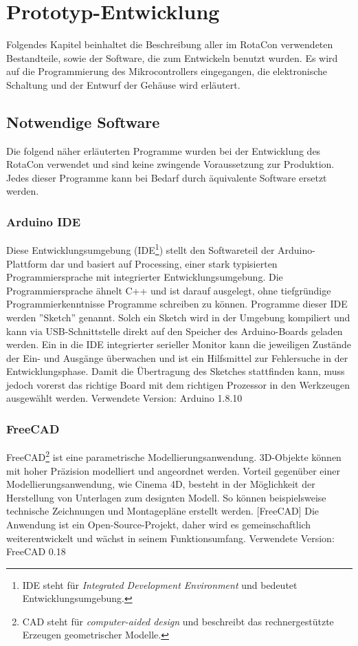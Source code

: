 \documentclass[11pt, titlepage]{report}
\begin{document}
	\chapter{Prototyp-Entwicklung}
	\label{sec:Praxistil}
		Folgendes Kapitel beinhaltet die Beschreibung aller im RotaCon verwendeten Bestandteile, sowie der Software, die zum Entwickeln benutzt wurden.
		Es wird auf die Programmierung des Mikrocontrollers eingegangen, die elektronische Schaltung und der Entwurf der Gehäuse wird erläutert.
		\section{Notwendige Software}
			Die folgend näher erläuterten Programme wurden bei der Entwicklung des RotaCon verwendet und sind keine zwingende Voraussetzung zur Produktion. Jedes dieser Programme kann bei Bedarf durch äquivalente Software ersetzt werden. 
			\subsection*{Arduino IDE}
			\label{sec:Arduino IDE}
				Diese Entwicklungsumgebung (IDE\footnote{IDE steht für \textit{Integrated Development Environment} und bedeutet Entwicklungsumgebung.}) stellt den Softwareteil der Arduino-Plattform dar und basiert auf Processing, einer stark typisierten Programmiersprache mit integrierter Entwicklungsumgebung. Die Programmiersprache ähnelt C++ und ist darauf ausgelegt, ohne tiefgründige Programmierkenntnisse Programme schreiben zu können. Programme dieser IDE werden ''Sketch'' genannt. \newline Solch ein Sketch wird in der Umgebung kompiliert und kann via USB-Schnittstelle direkt auf den Speicher des Arduino-Boards geladen werden. Ein in die IDE integrierter serieller Monitor kann die jeweiligen Zustände der Ein- und Ausgänge überwachen und ist ein Hilfsmittel zur Fehlersuche in der Entwicklungsphase.
				\newline Damit die Übertragung des Sketches stattfinden kann, muss jedoch vorerst das richtige Board mit dem richtigen Prozessor in den Werkzeugen ausgewählt werden. Verwendete Version: Arduino 1.8.10
			\subsection*{FreeCAD}
			\label{sec:FreeCAD}
				FreeCAD\footnote{CAD steht für \textit{computer-aided design} und beschreibt das rechnergestützte Erzeugen geometrischer Modelle.} ist eine parametrische Modellierungsanwendung. 3D-Objekte können mit hoher Präzision modelliert und angeordnet werden. Vorteil gegenüber einer Modellierungsanwendung, wie Cinema 4D, besteht in der Möglichkeit der Herstellung von Unterlagen zum designten Modell. So können beispielsweise technische Zeichnungen und Montagepläne erstellt werden. [FreeCAD\cite{FreeCAD}] 
				\newline Die Anwendung ist ein Open-Source-Projekt, daher wird es gemeinschaftlich weiterentwickelt und wächst in seinem Funktionsumfang. Verwendete Version: FreeCAD 0.18
			\newpage	
\end{document}
